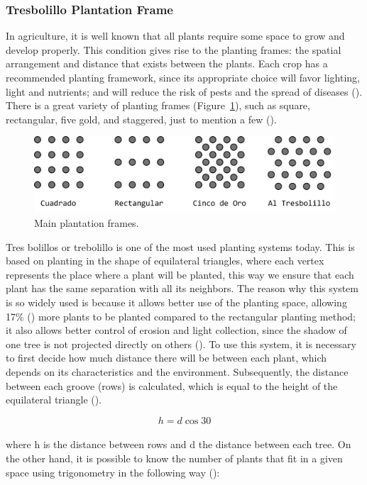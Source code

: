 \documentclass{amsart}
\begin{document}
            \subsubsection{Tresbolillo Plantation Frame}
            In agriculture, it is well known that all plants require some space to grow and develop properly. This condition gives rise to the planting frames: the spatial arrangement and distance that exists between the plants. Each crop has a recommended planting framework, since its appropriate choice will favor lighting, light and nutrients; and will reduce the risk of pests and the spread of diseases (\cite{Balam2022}). There is a great variety of planting frames (Figure~\ref{fig:MarcosDePlantación}), such as square, rectangular, five gold, and staggered, just to mention a few (\cite{Balam2022}).
            
            \begin{figure}
                \centering
                \includegraphics[width=0.8\linewidth]{Sources/figura1.png}
                \caption{Main plantation frames.}\label{fig:MarcosDePlantación}
            \end{figure}
            
            Tres bolillos or trebolillo is one of the most used planting systems today. This is based on planting in the shape of equilateral triangles, where each vertex represents the place where a plant will be planted, this way we ensure that each plant has the same separation with all its neighbors. The reason why this system is so widely used is because it allows better use of the planting space, allowing 17\% (\cite{Anonimo1}) more plants to be planted compared to the rectangular planting method; it also allows better control of erosion and light collection, since the shadow of one tree is not projected directly on others (\cite{Iglesias}).
            To use this system, it is necessary to first decide how much distance there will be between each plant, which depends on its characteristics and the environment. Subsequently, the distance between each groove (rows) is calculated, which is equal to the height of the equilateral triangle (\cite{Guerrero2018}).

            \begin{equation}
                h = d\cos{30}
            \end{equation}
            \\
            where h is the distance between rows and d the distance between each tree. On the other hand, it is possible to know the number of plants that fit in a given space using trigonometry in the following way (\cite{Carbo}):
\end{document}
